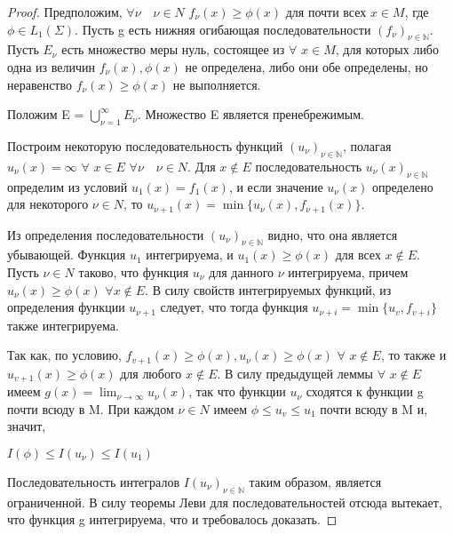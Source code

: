 \documentclass[a4paper]{article}
\theoremstyle{definition}
\theoremstyle{remark}
\begin{document}
     \begin{proof}
          Предположим, $\forall \nu \quad \nu \in N$ 
          $f_\nu(x)\geq \phi(x)$ для почти всех $x\in M$, где $\phi \in L_1(\Sigma)$. Пусть g есть 
          нижняя огибающая последовательности $(f_\nu)_{\nu\in \mathbb{N}}$. Пусть $E_\nu$ есть  
          множество меры нуль, состоящее из $\forall$ $x\in M$, для которых либо 
          одна из величин $f_\nu(x), \phi(x)$ не определена, либо они обе определены, 
          но неравенство $f_\nu(x) \geq \phi(x)$ не выполняется. 
          
          Положим E = $\bigcup_{\nu = 1}^\infty E_\nu$.
          Множество E является пренебрежимым.

          Построим некоторую последовательность функций $(u_\nu)_{\nu\in \mathbb{N}}$,  
          полагая $u_\nu(x) = \infty$ $\forall$ $x\in E$ $\forall \nu \quad \nu \in N$. Для $x\notin E$ 
          последовательность $u_\nu(x)_{\nu\in \mathbb{N}}$ определим из условий $u_1(x) = f_1(x)$, 
          и если значение $u_\nu(x)$ определено для некоторого $\nu \in N$, то 
          $u_{\nu+1}(x) = \min\{u_\nu(x), f_{\nu+1}(x)\}. $

          Из определения последовательности $(u_\nu)_{\nu\in \mathbb{N}}$ видно, что она  
          является убывающей. Функция $u_1$ интегрируема, и $u_1(x) \geq \phi(x)$ для всех 
          $x\notin E$. Пусть $\nu \in N$ таково, что функция $u_\nu$ для данного $\nu$
          интегрируема, причем $u_\nu(x) \geq \phi(x)$ $\forall x\notin E$. В силу свойств  
          интегрируемых функций, из определения 
          функции $u_{\nu + 1}$ следует, что тогда функция $u_{\nu+i} = \min\{u_v, f_{v+i}\}$ 
          также интегрируема. 
          
          Так как, по условию, $f_{v+1}(x) \geq\phi(x), u_\nu(x) \geq \phi(x)$ $\forall$
          $x\notin E$, то также и $u_{v+1}(x) \geq \phi(x)$ для любого $x\notin E$. 
          В силу предыдущей леммы $\forall$ $x\notin E$ имеем $g(x) = \lim_{\nu\to \infty} u_\nu(x)$, так 
          что функции $u_\nu$ сходятся к функции g почти всюду в M. При каждом 
          $\nu \in N$ имеем $\phi \leq u_v \leq u_1$ почти всюду в M и, значит,

          $I(\phi)\leq I(u_\nu)\leq I(u_1)$ 

          Последовательность интегралов $I(u_\nu)_{\nu\in \mathbb{N}}$ таким образом,  
          является ограниченной. В силу теоремы Леви для последовательностей 
          отсюда вытекает, что функция g 
          интегрируема, что и требовалось доказать. 


\end{proof}
\end{document}
